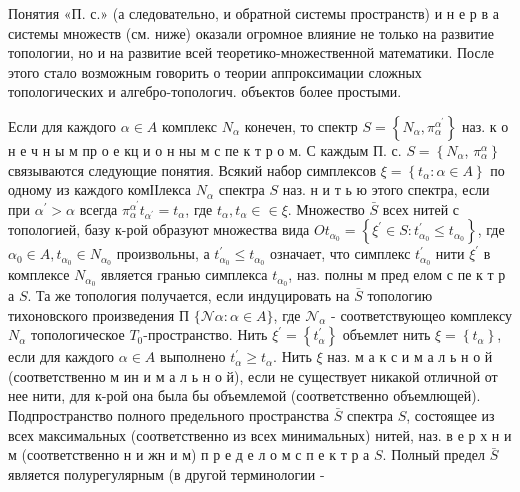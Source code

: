 \documentclass[10pt]{article}
\begin{document}
Понятия «П. с.» (а следовательно, и обратной системы пространств) и н е р в а системы множеств (см. ниже) оказали огромное влияние не только на развитие топологии, но и на развитие всей теоретико-множественной математики. После этого стало возможным говорить о теории аппроксимации сложных топологических и алгебро-топологич. объектов более простыми.



Если для каждого $\alpha \in A$ комплекс $N_{\alpha}$ конечен, то спектр $S=\left\{N_{\alpha}, \pi_{\alpha}^{\alpha^{\prime}}\right\}$ наз. к о н е ч н ы м пр о е кц и о н ны м с пе к т р о м. С каждым П. с. $S=\left\{N_{\alpha}\right.$, $\left.\pi_{\alpha}^{\alpha}\right\}$ связываются следующие понятия. Всякий набор симплексов $\xi=\left\{t_{\alpha}: \alpha \in A\right\}$ по одному из каждого комІІлекса $N_{\alpha}$ спектра $S$ наз. н и т ь ю этого спектра, если при $\alpha^{\prime}>\alpha$ всегда $\pi_{\alpha}^{\alpha^{\prime}} t_{\alpha^{\prime}}=t_{\alpha}$, где $t_{\alpha}, t_{\alpha} \in \in \xi$. Множество $\bar{S}$ всех нитей с топологией, базу к-рой образуют множества вида $O t_{\alpha_{0}}=\left\{\xi^{\prime} \in S: t_{\alpha_{0}}^{\prime} \leqslant t_{\alpha_{0}}\right\}$, где $\alpha_{0} \in A, t_{\alpha_{0}} \in N_{\alpha_{0}}$ произвольны, а $t_{\alpha_{0}}^{\prime} \leqslant t_{\alpha_{0}}$ означает, что симплекс $t_{\alpha_{0}}^{\prime}$ нити $\xi^{\prime}$ в комплексе $N_{\alpha_{0}}$ является гранью симплекса $t_{\alpha_{0}}$, наз. полны м пред елом с пе к т р а $S$. Та же топология получается, если индуцировать на $\bar{S}$ топологию тихоновского произведения П $\{\mathcal{N} \alpha: \alpha \in A\}$, где $\mathcal{N}_{\alpha}$ - соответствующео комплексу $N_{\alpha}$ топологическое $T_{0}$-пространство. Нить $\xi^{\prime}=\left\{t_{\alpha}^{\prime}\right\}$ объемлет нить $\xi=\left\{t_{\alpha}\right\}$, если для каждого $\alpha \in A$ выполнено $t_{\alpha}^{\prime} \geqslant t_{\alpha}$. Нить $\xi$ наз. м а к с и м а л ь н о й (соответственно м ин и м а л ь н о й), если не существует никакой отличной от нее нити, для к-рой она была бы объемлемой (соответственно объемлющей). Подпространство полного предельного пространства $\bar{S}$ спектра $S$, состоящее из всех максимальных (соответственно из всех минимальных) нитей, наз. в е р х н и м (соответственно н и жн и м) п р е д е л о м с п е к т р а $S$. Полный предел $\bar{S}$ является полурегулярным (в другой терминологии -
\end{document}
